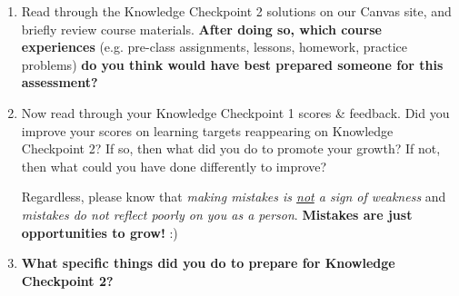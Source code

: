 \documentclass[10pt]{article}
\begin{document}
\begin{enumerate}

\item Read through the Knowledge Checkpoint 2 solutions on our Canvas site, and briefly review course materials. {\bf After doing so, which course experiences} (e.g. pre-class assignments, lessons, homework, practice problems) {\bf do you think would have best prepared someone for this assessment?}

    \vfill

\item Now read through your Knowledge Checkpoint 1 scores \& feedback. Did you improve your scores on learning targets reappearing on Knowledge Checkpoint 2? If so, then what did you do to promote your growth? If not, then what could you have done differently to improve?

\vfill

Regardless, please know that {\it making mistakes is \underline{not} a sign of weakness} and {\it mistakes do not reflect poorly on you as a person}. {\bf Mistakes are just opportunities to  grow!} :)

\newpage

\item {\bf What specific things did you do to prepare for Knowledge Checkpoint 2?}\\


\end{enumerate}
\end{document}

